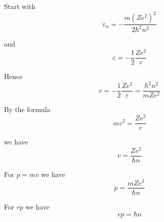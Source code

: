 


\bigskip
Start with
\begin{equation*}
\varepsilon_n=-\frac{m(Ze^2)^2}{2\hbar^2n^2}
\end{equation*}

and
\begin{equation*}
\varepsilon=-\frac{1}{2}\frac{Ze^2}{r}
\end{equation*}

Hence
\begin{equation*}
r=-\frac{1}{2}\frac{Ze^2}{\varepsilon}=\frac{\hbar^2n^2}{mZe^2}\tag{1}
\end{equation*}

By the formula
\begin{equation*}
mv^2=\frac{Ze^2}{r}
\end{equation*}

we have
\begin{equation*}
v=\frac{Ze^2}{\hbar n}\tag{2}
\end{equation*}

For $p=mv$ we have
\begin{equation*}
p=\frac{mZe^2}{\hbar n}\tag{3}
\end{equation*}

For $rp$ we have
\begin{equation*}
rp=\hbar n\tag{4}
\end{equation*}


